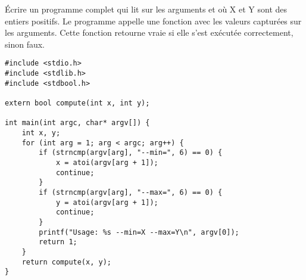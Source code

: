 \documentclass[french,a4paper,addpoints,11pt]{exam}
\begin{document}
\begin{questions}
\question Écrire un programme complet qui lit sur les arguments  et  où X et Y sont des entiers positifs. Le programme appelle une fonction  avec les valeurs capturées sur les arguments. Cette fonction retourne vraie si elle s'est exécutée correctement, sinon faux.

\begin{solution}
\begin{lstlisting}
#include <stdio.h>
#include <stdlib.h>
#include <stdbool.h>

extern bool compute(int x, int y);

int main(int argc, char* argv[]) {
    int x, y;
    for (int arg = 1; arg < argc; arg++) {
        if (strncmp(argv[arg], "--min=", 6) == 0) {
            x = atoi(argv[arg + 1]);
            continue;
        }
        if (strncmp(argv[arg], "--max=", 6) == 0) {
            y = atoi(argv[arg + 1]);
            continue;
        }
        printf("Usage: %s --min=X --max=Y\n", argv[0]);
        return 1;
    }
    return compute(x, y);
}
\end{lstlisting}
\end{solution}

\end{questions}
\end{document}
